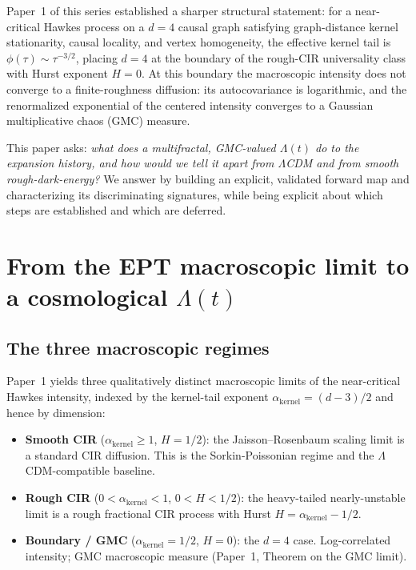 \documentclass[11pt,a4paper]{article}
\begin{document}
Paper~1 of this series established a sharper structural statement: for a near-critical Hawkes process on a $d=4$ causal graph satisfying graph-distance kernel stationarity, causal locality, and vertex homogeneity, the effective kernel tail is $\phi(\tau)\sim\tau^{-3/2}$, placing $d=4$ at the boundary of the rough-CIR universality class with Hurst exponent $H=0$. At this boundary the macroscopic intensity does not converge to a finite-roughness diffusion: its autocovariance is logarithmic, and the renormalized exponential of the centered intensity converges to a Gaussian multiplicative chaos (GMC) measure.

This paper asks: \emph{what does a multifractal, GMC-valued $\Lambda(t)$ do to the expansion history, and how would we tell it apart from $\Lambda$CDM and from smooth rough-dark-energy?} We answer by building an explicit, validated forward map and characterizing its discriminating signatures, while being explicit about which steps are established and which are deferred.

\section{From the EPT macroscopic limit to a cosmological $\Lambda(t)$}

\subsection{The three macroscopic regimes}

Paper~1 yields three qualitatively distinct macroscopic limits of the near-critical Hawkes intensity, indexed by the kernel-tail exponent $\alpha_{\mathrm{kernel}}=(d-3)/2$ and hence by dimension:
\begin{itemize}
\item \textbf{Smooth CIR} ($\alpha_{\mathrm{kernel}}\ge 1$, $H=1/2$): the Jaisson--Rosenbaum \cite{JaissonRosenbaum2015} scaling limit is a standard CIR diffusion. This is the Sorkin-Poissonian regime and the $\Lambda$CDM-compatible baseline.
\item \textbf{Rough CIR} ($0<\alpha_{\mathrm{kernel}}<1$, $0<H<1/2$): the heavy-tailed nearly-unstable limit \cite{JaissonRosenbaum2016} is a rough fractional CIR process with Hurst $H=\alpha_{\mathrm{kernel}}-1/2$.
\item \textbf{Boundary / GMC} ($\alpha_{\mathrm{kernel}}=1/2$, $H=0$): the $d=4$ case. Log-correlated intensity; GMC macroscopic measure (Paper~1, Theorem on the GMC limit).
\end{itemize}
\end{document}
